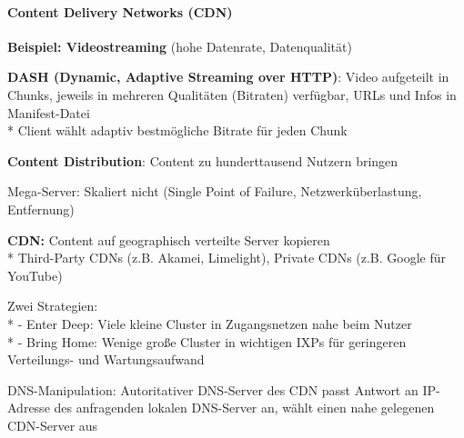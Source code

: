 \paragraph{Content Delivery Networks (CDN)}
\begin{items}
	\item \textbf{Beispiel: Videostreaming} (hohe Datenrate, Datenqualität)
	\item \textbf{DASH (Dynamic, Adaptive Streaming over HTTP)}: Video aufgeteilt in Chunks, jeweils in mehreren Qualitäten (Bitraten) verfügbar, URLs und Infos in Manifest-Datei\\*
	Client wählt adaptiv bestmögliche Bitrate für jeden Chunk
	\item \textbf{Content Distribution}: Content zu hunderttausend Nutzern bringen
	\item Mega-Server: Skaliert nicht (Single Point of Failure, Netzwerküberlastung, Entfernung)
	\item \textbf{CDN:} Content auf geographisch verteilte Server kopieren\\*
		Third-Party CDNs (z.B. Akamei, Limelight), Private CDNs (z.B. Google für YouTube)
	\item Zwei Strategien:\\*
		- Enter Deep: Viele kleine Cluster in Zugangsnetzen nahe beim Nutzer\\*
		- Bring Home: Wenige große Cluster in wichtigen IXPs für geringeren Verteilungs- und Wartungsaufwand
	\item DNS-Manipulation: Autoritativer DNS-Server des CDN passt Antwort an IP-Adresse des anfragenden lokalen DNS-Server an, wählt einen nahe gelegenen CDN-Server aus
\end{items}